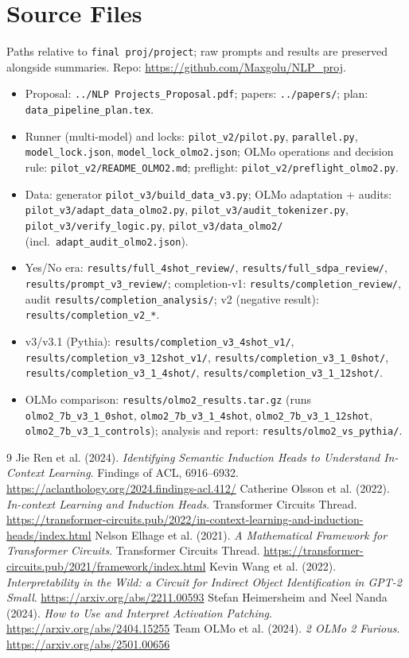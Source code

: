 \documentclass[11pt,a4paper]{article}
\newcommand{\file}[1]{\nolinkurl{#1}}
\begin{document}
\appendix
\section{Source Files}
Paths relative to \texttt{final proj/project}; raw prompts and results are preserved alongside summaries. Repo: \url{https://github.com/Maxgolu/NLP_proj}.
\begin{itemize}
\item Proposal: \file{../NLP Projects_Proposal.pdf}; papers: \file{../papers/}; plan: \file{data_pipeline_plan.tex}.
\item Runner (multi-model) and locks: \file{pilot_v2/pilot.py}, \file{parallel.py}, \file{model_lock.json}, \file{model_lock_olmo2.json}; OLMo operations and decision rule: \file{pilot_v2/README_OLMO2.md}; preflight: \file{pilot_v2/preflight_olmo2.py}.
\item Data: generator \file{pilot_v3/build_data_v3.py}; OLMo adaptation + audits: \file{pilot_v3/adapt_data_olmo2.py}, \file{pilot_v3/audit_tokenizer.py}, \file{pilot_v3/verify_logic.py}, \file{pilot_v3/data_olmo2/} (incl.\ \file{adapt_audit_olmo2.json}).
\item Yes/No era: \file{results/full_4shot_review/}, \file{results/full_sdpa_review/}, \file{results/prompt_v3_review/}; completion-v1: \file{results/completion_review/}, audit \file{results/completion_analysis/}; v2 (negative result): \file{results/completion_v2_*}.
\item v3/v3.1 (Pythia): \file{results/completion_v3_4shot_v1/}, \file{results/completion_v3_12shot_v1/}, \file{results/completion_v3_1_0shot/}, \file{results/completion_v3_1_4shot/}, \file{results/completion_v3_1_12shot/}.
\item OLMo comparison: \file{results/olmo2_results.tar.gz} (runs \file{olmo2_7b_v3_1_0shot}, \file{olmo2_7b_v3_1_4shot}, \file{olmo2_7b_v3_1_12shot}, \file{olmo2_7b_v3_1_controls}); analysis and report: \file{results/olmo2_vs_pythia/}.
\end{itemize}

\begin{thebibliography}{9}
 Jie Ren et al. (2024). \emph{Identifying Semantic Induction Heads to Understand In-Context Learning}. Findings of ACL, 6916--6932. \url{https://aclanthology.org/2024.findings-acl.412/}
 Catherine Olsson et al. (2022). \emph{In-context Learning and Induction Heads}. Transformer Circuits Thread. \url{https://transformer-circuits.pub/2022/in-context-learning-and-induction-heads/index.html}
 Nelson Elhage et al. (2021). \emph{A Mathematical Framework for Transformer Circuits}. Transformer Circuits Thread. \url{https://transformer-circuits.pub/2021/framework/index.html}
 Kevin Wang et al. (2022). \emph{Interpretability in the Wild: a Circuit for Indirect Object Identification in GPT-2 Small}. \url{https://arxiv.org/abs/2211.00593}
 Stefan Heimersheim and Neel Nanda (2024). \emph{How to Use and Interpret Activation Patching}. \url{https://arxiv.org/abs/2404.15255}
 Team OLMo et al. (2024). \emph{2 OLMo 2 Furious}. \url{https://arxiv.org/abs/2501.00656}
\end{thebibliography}
\end{document}
